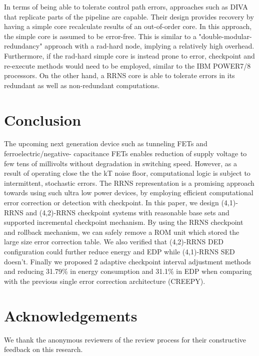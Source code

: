 \documentclass{sig-alternate}
\begin{document}
In terms of being able to tolerate control path errors, approaches such as DIVA\cite{DIVA} that replicate parts of the pipeline are capable. Their design provides recovery by having a simple core recalculate results of an out-of-order core. In this approach, the simple core is assumed to be error-free.  This is similar to a "double-modular-redundancy" approach with a rad-hard node, implying a relatively high overhead. Furthermore, if the rad-hard simple core is instead prone to error, checkpoint and re-execute methods would need to be employed, similar to the IBM POWER7/8 processors\cite{ibmpower8}. On the other hand, a RRNS core is able to tolerate errors in its redundant as well as non-redundant computations.

\section{Conclusion}
The upcoming next generation device such as tunneling FETs and ferroelectric/negative- capacitance FETs enables reduction of supply voltage to few tens of millivolts without degradation in switching speed. However, as a result of operating close the the kT noise  floor, computational logic is subject to intermittent, stochastic errors.  The RRNS representation is a promising approach towards using such ultra low power devices, by employing efficient computational error correction or detection with checkpoint.
In this paper, we design (4,1)-RRNS and (4,2)-RRNS checkpoint systems with reasonable base sets and supported incremental checkpoint mechanism. By using the RRNS checkpoint and rollback mechanism, we can safely remove a ROM unit which stored the large size error correction table. We also verified that (4,2)-RRNS DED configuration could further reduce energy and EDP while (4,1)-RRNS SED doesn't. Finally we proposed 2 adaptive checkpoint interval adjustment methods and reducing 31.79\% in energy consumption and 31.1\% in EDP when comparing with the previous single error correction architecture (CREEPY). 

\section*{Acknowledgements}
We thank the anonymous reviewers of the review process for their constructive feedback on this research.



\end{document}
